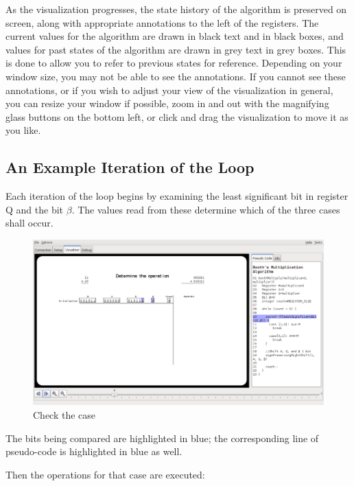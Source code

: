 \documentclass{article}
\begin{document}
As the visualization progresses, the state history of the algorithm is preserved on screen, along with appropriate annotations to the left of the registers.
The current values for the algorithm are drawn in black text and in black boxes, and values for past states of the algorithm are drawn in grey text in grey boxes.
This is done to allow you to refer to previous states for reference.
Depending on your window size, you may not be able to see the annotations.
If you cannot see these annotations, or if you wish to adjust your view of the visualization in general, you can resize your window if possible, zoom in and out with the magnifying glass buttons on the bottom left, or click and drag the visualization to move it as you like.

\pagebreak
\subsection{An Example Iteration of the Loop}
Each iteration of the loop begins by examining the least significant bit in register Q and the bit $\beta$.
The values read from these determine which of the three cases shall occur.

\begin{figure}[h]
\centering
\includegraphics[scale=0.3]{cases.pdf}
\caption{Check the case}
\end{figure}

The bits being compared are highlighted in blue; the corresponding line of pseudo-code is highlighted in blue as well.

\pagebreak
Then the operations for that case are executed:
\end{document}
